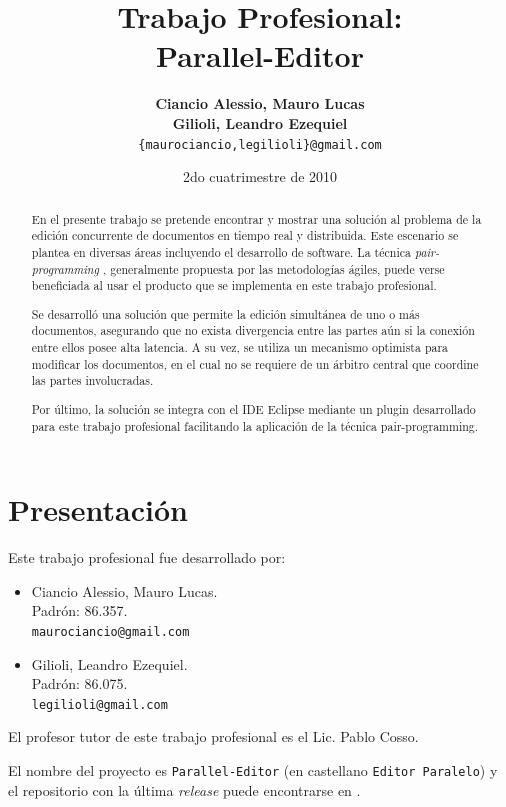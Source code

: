 \documentclass[12pt,a4paper]{article}
\title { \textbf{Trabajo Profesional: \\ Parallel-Editor}}
\date{2do cuatrimestre de 2010}
\author{\textbf{Ciancio Alessio, Mauro Lucas} \\
		\textbf{Gilioli, Leandro Ezequiel}	  \\
		\texttt{\{maurociancio,legilioli\}@gmail.com}
	}
\let\stdsection\section
\renewcommand\section{\newpage\stdsection}
\begin{document}
\maketitle

\begin{abstract}
En el presente trabajo se pretende encontrar y mostrar una solución al problema de
la edición concurrente de documentos en tiempo real y distribuida. Este escenario se plantea en
diversas áreas incluyendo el desarrollo de software. La técnica \textit{pair-programming} \cite{pair-programming},
generalmente propuesta por las metodologías ágiles, puede verse beneficiada al usar 
el producto que se implementa en este trabajo profesional.

Se desarrolló una solución que permite la edición simultánea de uno o más documentos, asegurando
que no exista divergencia entre las partes aún si la conexión entre ellos posee alta latencia. A su vez,
se utiliza un mecanismo optimista para modificar los documentos, en el cual no se requiere de un árbitro
central que coordine las partes involucradas.

Por último, la solución se integra con el IDE Eclipse \cite{eclipse-ide} mediante un plugin desarrollado 
para este trabajo profesional facilitando la aplicación de la técnica pair-programming.
\end{abstract}

\newpage
\tableofcontents
\newpage

\section{Presentación}

Este trabajo profesional fue desarrollado por:

	\begin{itemize}
		\item Ciancio Alessio, Mauro Lucas. \\
		      Padrón: 86.357. \\
		      \texttt{maurociancio@gmail.com}
		\item Gilioli, Leandro Ezequiel. \\
		      Padrón: 86.075. \\
   		      \texttt{legilioli@gmail.com}
	\end{itemize}

El profesor tutor de este trabajo profesional es el Lic. Pablo Cosso.

El nombre del proyecto es \texttt{Parallel-Editor} (en castellano \texttt{Editor Paralelo}) y el repositorio con la
última \textit{release} puede encontrarse en \cite{github}.
\end{document}
